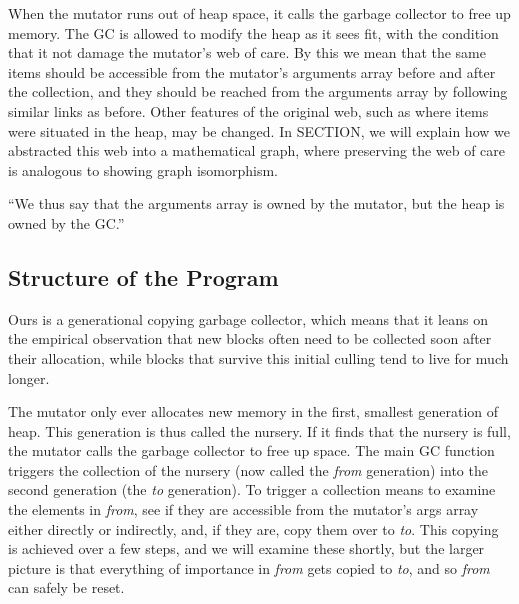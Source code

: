 When the mutator runs out of heap space, 
it calls the garbage collector to free up memory. 
The GC is allowed to modify the heap as
it sees fit, with the condition that it not damage the 
mutator's web of care. By this we mean that the same items 
should be accessible from the mutator's arguments
array before and after the collection, and they 
should be reached from the arguments array by 
following similar links as before. 
Other features of the original web, such as where 
items were situated in the heap, may be changed. 
In SECTION, we will explain how we abstracted this
web into a mathematical graph, where preserving the 
web of care is analogous to showing graph isomorphism.

``We thus say that the arguments array is owned by the 
mutator, but the heap is owned by the GC.''

\subsection{Structure of the Program}
\label{sec:gcstructure}
Ours is a generational copying garbage collector, which
means that it leans on the empirical observation that
new blocks often need to be collected soon after their
allocation, while blocks that survive this initial
culling tend to live for much longer.

The mutator only ever allocates new memory in the first, 
smallest generation of heap. This generation is thus 
called the nursery. If it finds that the nursery is full, 
the mutator calls the garbage collector to free up space.
The main GC function triggers the collection of the nursery 
(now called the \emph{from} generation)
into the second generation (the \emph{to} generation). 
To trigger a collection means to examine the elements 
in \emph{from}, see if they are accessible from the mutator's
args array either directly or indirectly, and, if they are, 
copy them over to \emph{to}. This copying is achieved over a few steps, 
and we will examine these shortly, but the larger picture is that 
everything of importance in \emph{from} gets copied to \emph{to}, 
and so \emph{from} can safely be reset. 

